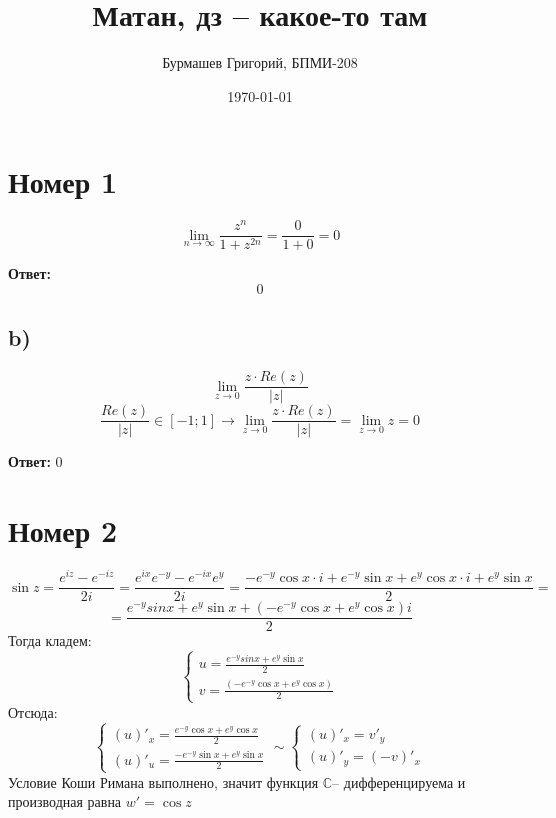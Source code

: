 \documentclass[a4paper,12pt]{article}
\author{Бурмашев Григорий, БПМИ-208}
\title{Матан, дз -- какое-то там}
\date{\today}
\begin{document}
\maketitle
\section*{Номер 1}
\[
\lim\limits_{n \rightarrow \infty} \frac{z^n}{1 + z^{2n}} = \frac{0}{1 + 0} = 0
\]
\begin{center}
\textbf{Ответ: } 
\[
0
\]
\end{center}
\subsection*{b)}
\[
\lim\limits_{z \rightarrow 0 }  \frac{z \cdot Re(z) }{|z|}
\]
\[
\frac{Re(z) }{|z|} \in [-1;1] \rightarrow \lim\limits_{z \rightarrow 0 }  \frac{z \cdot Re(z) }{|z|} = \lim\limits_{z \rightarrow 0 }  z = 0
\]
\begin{center}
\textbf{Ответ: } 0
\end{center}
\clearpage
\section*{Номер 2}
\[
\sin z = \frac{e^{iz} - e^{-iz}}{2i} = \frac{e^{ix}e^{-y} - e^{-ix} e^y}{2i} = \frac{-e^{-y} \cos x \cdot  i + e^{-y} \sin x + e^y \cos x \cdot i + e^y \sin x}{2}  =
\]
\[
=
\frac{e^{-y} sin x + e^{y} \sin x  + (-e^{-y} \cos x + e^y \cos x)i }{2}
\]
Тогда кладем:
\[
\begin{cases}
u = \frac{e^{-y} sin x + e^{y} \sin x }{2}  \\
v = \frac{(-e^{-y} \cos x + e^y \cos x)}{2}
\end{cases}
\]
Отсюда:
\[
\begin{cases}
(u)'_x = \frac{e^{-y} \cos x + e^y \cos x}{2} \\
(u)'_u = \frac{-e^{-y} \sin x + e^y \sin x}{2}
\end{cases} \sim \begin{cases}
(u)'_x = v'_y \\
(u)'_y = (-v)'_x
\end{cases}
\]
Условие Коши Римана выполнено, значит функция $\mathbb{C}$-- дифференцируема и производная равна $w' = \cos z$
\clearpage
\end{document}

